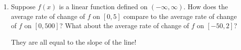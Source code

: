 \documentclass{article}
\begin{document}
\begin{enumerate}
\begin{enumerate}
  \end{enumerate}

\item  


  \begin{problem}[\stretch{2}]
    Suppose $f(x)$ is a linear function defined on $(-\infty, 
    \infty)$. How does the average rate of change of $f$ on $[0, 5]$
    compare to the average rate of change of $f$ on $[0, 500]$? What about
    the average rate of change of $f$ on $[-50, 2]$?
  \end{problem}

  \begin{solution}
    They are all equal to the slope of the line!
  \end{solution} 

\end{enumerate}
\end{document}

